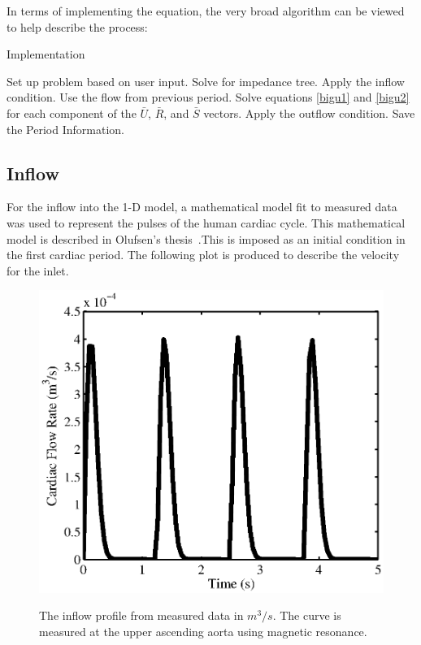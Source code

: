\documentclass[12pt]{article}
\newcommand{\tensor}[1]{\bar{#1}}
\begin{document}
In terms of implementing the equation, the very broad algorithm can be viewed to help describe the process:

\begin{algorithm}
\caption{Implementation}\label{euclid}
\begin{algorithmic}[1]
\State Set up problem based on user input.
\State Solve for impedance tree.
		\State Apply the inflow condition.
	\Else
		\State Use the flow from previous period.
	\EndIf
			\State Solve equations \ref{bigu1} and \ref{bigu2} for each component of the $\tensor{U}$, $\tensor{R}$, and $\tensor{S}$ vectors.
		\EndFor
	\State Apply the outflow condition.
	\EndFor
\State Save the Period Information.
\EndFor
\end{algorithmic}
\end{algorithm}

\subsection{Inflow}

For the inflow into the 1-D model, a mathematical model fit to measured data was used to represent the pulses of the human cardiac cycle. This mathematical model is described in Olufsen's thesis~\cite{olufsenthesis}.This is imposed as an initial condition in the first cardiac period. The following plot is produced to describe the velocity for the inlet.

\pagebreak

\begin{figure}[ht]
	\centering
	\includegraphics{inflow}
	\label{inflower}
	\caption{The inflow profile from measured data in $m^3/s$. The curve is measured at the upper ascending aorta using magnetic resonance.}
\end{figure}
\end{document}
